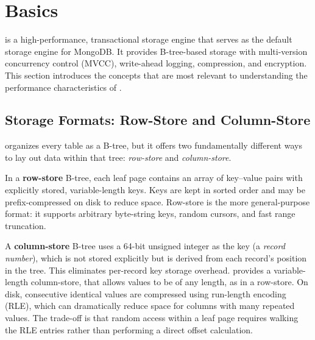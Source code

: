 
\section{\wt{} Basics}
\label{sec:wiredtiger-basics}

\wt{} is a high-performance, transactional storage engine that serves as the default storage engine for MongoDB.  
It provides B-tree-based storage with multi-version concurrency control (MVCC), write-ahead logging, compression, and encryption.
This section introduces the \wt{} concepts that are most relevant to understanding the performance characteristics of \project{}.

\subsection{Storage Formats: Row-Store and Column-Store}
\label{sec:wt-storage-formats}

\wt{} organizes every table as a B-tree, but it offers two fundamentally
different ways to lay out data within that tree: \emph{row-store} and
\emph{column-store}.

In a \textbf{row-store} B-tree, each leaf page contains an array of key--value
pairs with explicitly stored, variable-length keys.  
Keys are kept in sorted order and may be prefix-compressed on disk to reduce space.  
Row-store is the more general-purpose format: it supports arbitrary byte-string keys, random cursors, and fast range truncation.

A \textbf{column-store} B-tree uses a 64-bit unsigned integer as the key
(a \emph{record number}), which is not stored explicitly but is derived
from each record's position in the tree.  
This eliminates per-record key storage overhead.
\wt{} provides a variable-length column-store, that allows values to be of any length, as in a row-store.  
On disk, consecutive identical values are compressed using run-length encoding (RLE), which can dramatically reduce space for columns with many repeated values.
The trade-off is that random access within a leaf page requires walking the RLE entries rather than performing a direct offset calculation.

